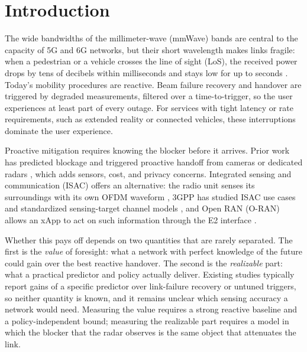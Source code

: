 \documentclass[conference]{IEEEtran}
\begin{document}
\section{Introduction}
The wide bandwidths of the millimeter-wave (mmWave) bands are central to
the capacity of 5G and 6G networks, but their short wavelength makes
links fragile: when a pedestrian or a vehicle crosses the line of sight
(LoS), the received power drops by tens of decibels within milliseconds
and stays low for up to seconds
\cite{rappaport2013mmwave,maccartney2017blockage}. Today's mobility
procedures are reactive. Beam failure recovery and handover are
triggered by degraded measurements, filtered over a time-to-trigger, so
the user experiences at least part of every outage. For services with
tight latency or rate requirements, such as extended reality or
connected vehicles, these interruptions dominate the user experience.

Proactive mitigation requires knowing the blocker before it arrives.
Prior work has predicted blockage and triggered proactive handoff from
cameras or dedicated radars
\cite{charan2021vision,demirhan2022radar,alkhateeb2023deepsense}, which
adds sensors, cost, and privacy concerns. Integrated sensing and
communication (ISAC) offers an alternative: the radio unit senses its
surroundings with its own OFDM waveform \cite{liu2022isac,sturm2011ofdm},
3GPP has studied ISAC use cases and standardized sensing-target channel
models \cite{3gpp22837,3gpp38901}, and Open RAN (O-RAN) allows an xApp to
act on such information through the E2 interface
\cite{polese2023oran,bonati2021intelligence}.

Whether this pays off depends on two quantities that are rarely
separated. The first is the \emph{value} of foresight: what a network
with perfect knowledge of the future could gain over the best reactive
handover. The second is the \emph{realizable} part: what a practical
predictor and policy actually deliver. Existing studies typically
report gains of a specific predictor over link-failure recovery or
untuned triggers, so neither quantity is known, and it remains unclear
which sensing accuracy a network would need. Measuring the value
requires a strong reactive baseline and a policy-independent bound;
measuring the realizable part requires a model in which the blocker that
the radar observes is the same object that attenuates the link.
\end{document}

